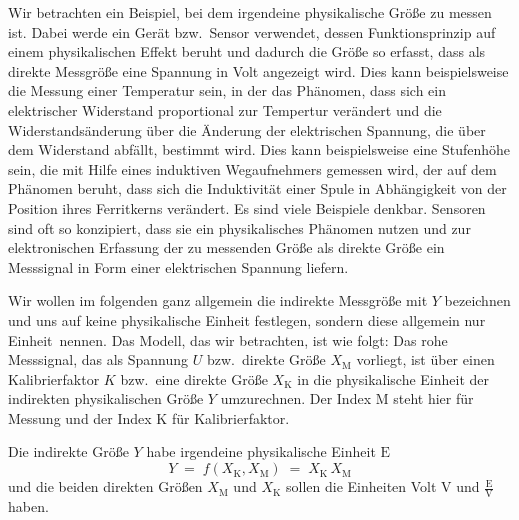 Wir betrachten ein Beispiel, bei dem irgendeine physikalische Größe zu messen ist.
Dabei werde ein Gerät bzw.\ Sensor verwendet, dessen Funktionsprinzip auf einem
physikalischen Effekt beruht und dadurch die Größe so erfasst,
dass als direkte Messgröße eine Spannung in Volt angezeigt wird. Dies kann beispielsweise
die Messung einer Temperatur sein, in der das Phänomen, dass sich ein elektrischer
Widerstand proportional zur Tempertur verändert und die Widerstandsänderung über die
Änderung der elektrischen Spannung, die über dem Widerstand abfällt, bestimmt wird.
Dies kann beispielsweise eine Stufenhöhe sein, die mit Hilfe eines induktiven Wegaufnehmers
gemessen wird, der auf dem Phänomen beruht, dass sich die Induktivität einer Spule in Abhängigkeit
von der  Position ihres Ferritkerns verändert. Es sind viele Beispiele denkbar. Sensoren
sind oft so konzipiert, dass sie ein physikalisches Phänomen nutzen und zur elektronischen
Erfassung der zu messenden Größe als direkte Größe ein Messsignal in Form einer elektrischen
Spannung liefern.

Wir wollen im folgenden ganz allgemein die indirekte Messgröße mit $Y$
bezeichnen und uns auf keine physikalische Einheit festlegen, sondern diese allgemein nur
\glqq Einheit\grqq ~nennen. Das Modell, das wir betrachten, ist wie folgt: Das rohe Messsignal,
das als Spannung $U$ bzw.\ direkte Größe $X_\mathrm{M}$ vorliegt, ist über
einen Kalibrierfaktor $K$ bzw.\ eine direkte Größe $X_\mathrm{K}$
in die physikalische Einheit der indirekten physikalischen Größe $Y$ umzurechnen.
Der Index M steht hier für Messung und der Index K für Kalibrierfaktor.

Die indirekte Größe $Y$ habe irgendeine physikalische Einheit $\mathrm{E}$
\begin{equation}
Y \; = \; f(X_\mathrm{K}, X_\mathrm{M})  \; = \; X_\mathrm{K} \, X_\mathrm{M}
\end{equation}
und die beiden direkten Größen $X_\mathrm{M}$ und $X_\mathrm{K}$
sollen die Einheiten Volt $\mathrm{V}$ und $\frac{\mathrm{E}}{\mathrm{V}}$
haben.


